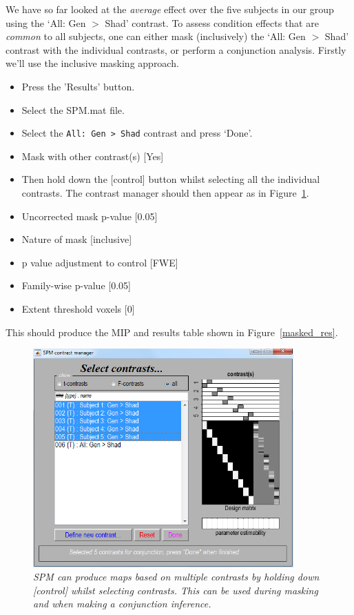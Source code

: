 We have so far looked at the {\em average} effect over the five subjects in our group using the `All: Gen $>$ Shad' contrast.
To assess condition effects that are {\em common} to all subjects, one can either mask (inclusively) the `All: Gen $>$ Shad' contrast with the individual contrasts, or perform a conjunction analysis. Firstly we'll use the inclusive masking
approach.
\begin{itemize}
\item{Press the 'Results' button.}
\item{Select the SPM.mat file.}
\item{Select the \verb!All: Gen > Shad! contrast and press `Done'.}
\item{Mask with other contrast(s) [Yes]}
\item{Then hold down the [control] button whilst selecting all the individual contrasts. The contrast manager should then appear as in Figure~\ref{masked_con}.}
\item{Uncorrected mask p-value [0.05]}
\item{Nature of mask [inclusive]}
\item{p value adjustment to control [FWE]}
\item{Family-wise p-value [0.05]}
\item{Extent threshold {voxels} [0]}
\end{itemize}
This should produce the MIP and results table shown in Figure~\ref{masked_res}.
\begin{figure}
\begin{center}
\includegraphics[width=100mm]{pet/masked_con}
\caption{\em SPM can produce maps based on multiple contrasts by holding down [control] whilst selecting contrasts. This can be used during masking and when making a conjunction inference. \label{masked_con}}
\end{center}
\end{figure}
